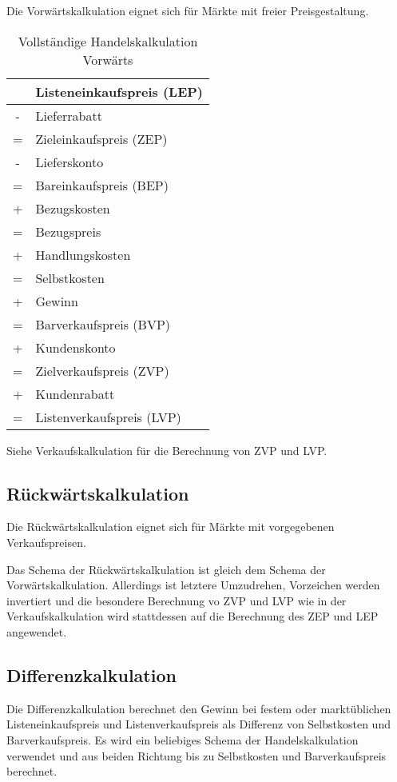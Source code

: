 Die Vorwärtskalkulation eignet sich für Märkte mit freier Preisgestaltung.

\begin{table}
    [H]
    \centering
    \begin{tabular}{c|l}
          & Listeneinkaufspreis (LEP) \\
        \hline
        - & Lieferrabatt              \\
        \hline
        = & Zieleinkaufspreis (ZEP)   \\
        \hline
        - & Lieferskonto              \\
        \hline
        = & Bareinkaufspreis (BEP)    \\
        \hline
        + & Bezugskosten              \\
        \hline
        = & Bezugspreis               \\
        \hline
        + & Handlungskosten           \\
        \hline
        = & Selbstkosten              \\
        \hline
        + & Gewinn                    \\
        \hline
        = & Barverkaufspreis (BVP)    \\
        \hline
        + & Kundenskonto              \\
        \hline
        = & Zielverkaufspreis (ZVP)   \\
        \hline
        + & Kundenrabatt              \\
        \hline
        = & Listenverkaufspreis (LVP) \\
    \end{tabular}
    \caption{Vollständige Handelskalkulation Vorwärts}
\end{table}

Siehe Verkaufskalkulation für die Berechnung von ZVP und LVP.

\subsection{Rückwärtskalkulation}

Die Rückwärtskalkulation eignet sich für Märkte mit vorgegebenen Verkaufspreisen.

Das Schema der Rückwärtskalkulation ist gleich dem Schema der Vorwärtskalkulation. Allerdings ist letztere Umzudrehen, Vorzeichen werden invertiert und die besondere Berechnung vo ZVP und LVP wie in der Verkaufskalkulation wird stattdessen auf die Berechnung des ZEP und LEP angewendet.

\subsection{Differenzkalkulation}

Die Differenzkalkulation berechnet den Gewinn bei festem oder marktüblichen Listeneinkaufspreis und Listenverkaufspreis als Differenz von Selbstkosten und Barverkaufspreis. Es wird ein beliebiges Schema der Handelskalkulation verwendet und aus beiden Richtung bis zu Selbstkosten und Barverkaufspreis berechnet.